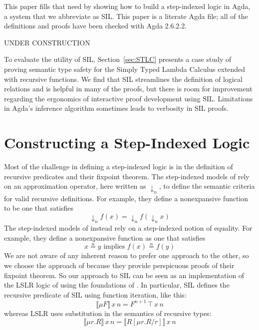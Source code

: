 \documentclass[acmsmall]{acmart}
\newcommand{\app}{\,}
\begin{document}
This paper fills that need by showing how to build a step-indexed
logic in Agda, a system that we abbreviate as SIL.  This paper is a
literate Agda file; all of the definitions and proofs have been
checked with Agda 2.6.2.2. 



UNDER CONSTRUCTION

To evaluate the utility of SIL, Section~\ref{sec:STLC} presents a case
study of proving semantic type safety for the Simply Typed Lambda
Calculus extended with recursive functions. We find that SIL
streamlines the definition of logical relations and is helpful in many
of the proofs, but there is room for improvement regarding the
ergonomics of interactive proof development using SIL.  Limitations in
Agda's inference algorithm sometimes leads to verbosity in SIL proofs.









\section{Constructing a Step-Indexed Logic}

Most of the challenge in defining a step-indexed logic is in the
definition of recursive predicates and their fixpoint theorem. The
step-indexed models of \citet{Appel:2001aa} rely on an approximation
operator, here written as $↓_n$, to define the semantic criteria for
valid recursive definitions.  For example, they define a nonexpansive
function to be one that satisfies
\[
  ↓_n f(x) = ↓_n f(↓_n x)
\]
The step-indexed models of \citet{JUNG:2018aa} instead rely on
a step-indexed notion of equality. For example, they define a
nonexpansive function as one that satisfies
\[
  x \stackrel{n}{=} y \text{ implies } f(x) \stackrel{n}{=} f(y)
\]
We are not aware of any inherent reason to prefer one approach to the
other, so we choose the approach of \citet{Appel:2001aa} because they
provide perspicuous proofs of their fixpoint theorem.  So our approach
to SIL can be seen as an implementation of the LSLR logic of
\citet{Dreyer:2011wl} using the foundations of
\citet{Appel:2001aa}. In particular, SIL defines the recursive
predicate of SIL using function iteration, like this:
\[
  ⟦ μ F ⟧ \, x \, n = F^{n\plus 1}\, \top \, x \, n
\]
whereas LSLR uses substitution in the semantics of recursive types:
\[
   ⟦ μ r. R ⟧ \, x \, n = ⟦ R[μr.R/r] ⟧\,x\,n
\]
\end{document}
